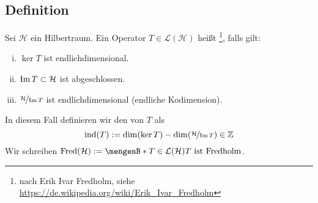 \subsection[Definition: Fredholm-Operator und Fredholm-Index]{Definition} %
\label{sub:91}
Sei $\mathcal{H}$ ein Hilbertraum. Ein Operator $T \in \mathcal{L}(\mathcal{H})$ heißt \footnote{nach Erik Ivar Fredholm, siehe 
\url{https://de.wikipedia.org/wiki/Erik_Ivar_Fredholm}}, falls gilt:
\begin{enumerate}[(i)]
	\item $\ker T$ ist endlichdimensional.
	\item $\operatorname{Im} T \subset \mathcal{H}$ ist abgeschlossen.
	\item $\nicefrac{\mathcal{H}}{\operatorname{Im} T}$ ist endlichdimensional (endliche Kodimension).
\end{enumerate}
In diesem Fall definieren wir den  von $T$ als 
\[
	\operatorname{ind}(T) := \dim(\ker T) - \dim (\nicefrac{\mathcal{H}}{\operatorname{Im} T}) \in \mathbb{Z} 
\]
Wir schreiben $\Fred(\mathcal{H}) := \set[T \in \mathcal{L}(\mathcal{H})]{T \text{ ist Fredholm}}$. 

